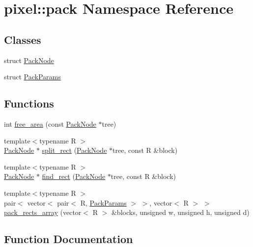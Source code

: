 \hypertarget{namespacepixel_1_1pack}{}\section{pixel\+:\+:pack Namespace Reference}
\label{namespacepixel_1_1pack}
\subsection*{Classes}
\begin{DoxyCompactItemize}
\item 
struct \hyperlink{structpixel_1_1pack_1_1_pack_node}{Pack\+Node}
\item 
struct \hyperlink{structpixel_1_1pack_1_1_pack_params}{Pack\+Params}
\end{DoxyCompactItemize}
\subsection*{Functions}
\begin{DoxyCompactItemize}
\item 
int \hyperlink{namespacepixel_1_1pack_a11d5f6090d9349fa694e3feed87b9172}{free\+\_\+area} (const \hyperlink{structpixel_1_1pack_1_1_pack_node}{Pack\+Node} $\ast$tree)
\item 
{\footnotesize template$<$typename R $>$ }\\\hyperlink{structpixel_1_1pack_1_1_pack_node}{Pack\+Node} $\ast$ \hyperlink{namespacepixel_1_1pack_a9f6003cbffbaf9c4694d88a2c10f2811}{split\+\_\+rect} (\hyperlink{structpixel_1_1pack_1_1_pack_node}{Pack\+Node} $\ast$tree, const R \&block)
\item 
{\footnotesize template$<$typename R $>$ }\\\hyperlink{structpixel_1_1pack_1_1_pack_node}{Pack\+Node} $\ast$ \hyperlink{namespacepixel_1_1pack_a4d3ce2ea8732e6fcda7f8e1f8d4f9d21}{find\+\_\+rect} (\hyperlink{structpixel_1_1pack_1_1_pack_node}{Pack\+Node} $\ast$tree, const R \&block)
\item 
{\footnotesize template$<$typename R $>$ }\\pair$<$ vector$<$ pair$<$ R, \hyperlink{structpixel_1_1pack_1_1_pack_params}{Pack\+Params} $>$ $>$, vector$<$ R $>$ $>$ \hyperlink{namespacepixel_1_1pack_ad9875063c72901283bcd63efa4d34594}{pack\+\_\+rects\+\_\+array} (vector$<$ R $>$ \&blocks, unsigned w, unsigned h, unsigned d)
\end{DoxyCompactItemize}


\subsection{Function Documentation}
\mbox{\label{namespacepixel_1_1pack_a4d3ce2ea8732e6fcda7f8e1f8d4f9d21}} 
